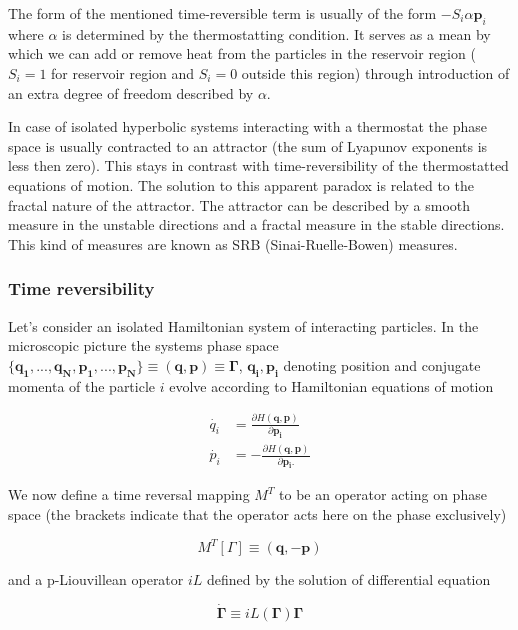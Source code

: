 \documentclass[a4paper,12pt]{article}
\begin{document}
The form of the mentioned time-reversible term is usually of the form $- S_i \alpha \bm{p}_i $ where $\alpha $ is determined by the thermostatting condition. It serves as a mean by which we can add or remove heat from the particles in the reservoir region ($S_i =1$ for reservoir region and $S_i = 0$ outside this region) through introduction of an extra degree of freedom described by $\alpha$.

In case of isolated hyperbolic systems interacting with a thermostat the phase space is usually contracted to an attractor (the sum of Lyapunov exponents is less then zero).
This stays in contrast with time-reversibility of the thermostatted equations of motion. The solution to this apparent paradox is related to the fractal nature of the attractor.
The attractor can be described by a smooth measure in the unstable directions and a fractal measure in the stable directions.
This kind of measures are known as SRB (Sinai-Ruelle-Bowen) measures. 

\subsubsection{Time reversibility}
Let's consider an isolated Hamiltonian system of interacting particles.
In the microscopic picture the systems phase space $\{\bm{q_1},...,\bm{q_N},\bm{p_1},...,\bm{p_N} \} \equiv (\bm{q},\bm{p})\equiv \bm{\Gamma} $, $\bm{q_i}, \bm{p_i} $ denoting position and conjugate momenta of the particle $i$ evolve according to Hamiltonian equations of motion

\begin{equation}
\begin{aligned}
  \dot{q_i} &=\frac{\partial H(\bm{q},\bm{p})}{\partial{\bm{p_i}}} \\
  \dot{p_i} &=- \frac{\partial H(\bm{q},\bm{p})}{\partial{\bm{p_i}}.}
\end{aligned}
\end{equation}

We now define a time reversal mapping $M^T$ to be an operator acting on phase space (the brackets indicate that the operator acts here on the phase exclusively) 

\begin{equation}
  M^T[ \Gamma] \equiv (\bm{q},-\bm{p})
\end{equation}

and a p-Liouvillean operator $iL$ defined by the solution of differential equation 

\begin{equation}
 \dot{\bm{\Gamma}} \equiv iL(\bm{\Gamma})\bm{\Gamma}
\end{equation}
\end{document}
